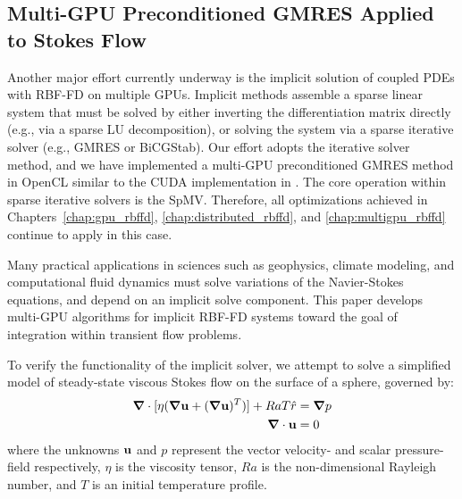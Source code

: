 
\subsection{Multi-GPU Preconditioned GMRES Applied to Stokes Flow}

%


Another major effort currently underway is the implicit solution of coupled PDEs with RBF-FD on multiple GPUs. Implicit methods assemble a sparse linear system that must be solved by either inverting the differentiation matrix directly (e.g., via a sparse LU decomposition), or solving the system via a sparse iterative solver (e.g., GMRES or BiCGStab).
Our effort adopts the iterative solver method, and we have implemented a multi-GPU preconditioned GMRES method in OpenCL similar to the CUDA implementation in \cite{Bahi2011}. The core operation within sparse iterative solvers is the SpMV. Therefore, all optimizations achieved in Chapters~\ref{chap:gpu_rbffd}, \ref{chap:distributed_rbffd}, and \ref{chap:multigpu_rbffd} continue to apply in this case. 

Many practical applications in sciences such as geophysics, climate modeling, and computational fluid dynamics must solve variations of the Navier-Stokes equations, and depend on an implicit solve component. This paper develops multi-GPU algorithms for implicit RBF-FD systems toward the goal of integration within transient flow problems.

To verify the functionality of the implicit solver, we attempt to solve a simplified model of steady-state viscous Stokes flow on the surface of a sphere, governed by: 
  \begin{align}
\mbox{\boldmath$ \nabla $} \cdot [\eta(\mbox{\boldmath$ \nabla $} \mathbf{u} + (\mbox{\boldmath$ \nabla $} \mathbf{u})^T)] + Ra T \hat{r} & = \mbox{\boldmath$ \nabla $} p \label{eq:stokes_momentum} \\
\mbox{\boldmath$ \nabla $} \cdot \mathbf{u} & = 0 \label{eq:stokes_continuity} 
\end{align}
where the unknowns $\mathbf{u}$ and $p$ represent the vector velocity- and scalar pressure-field respectively, $\eta$ is the viscosity tensor, $Ra$ is the non-dimensional Rayleigh number, and $T$ is an initial temperature profile. 

